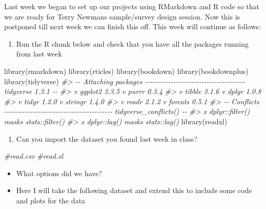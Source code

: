 \documentclass[
]{book}
\newenvironment{Shaded}{\begin{snugshade}}{\end{snugshade}}
\newcommand{\CommentTok}[1]{\textcolor[rgb]{0.56,0.35,0.01}{\textit{#1}}}
\newcommand{\FunctionTok}[1]{\textcolor[rgb]{0.00,0.00,0.00}{#1}}
\newcommand{\NormalTok}[1]{#1}
\providecommand{\tightlist}{%
  \setlength{\itemsep}{0pt}\setlength{\parskip}{0pt}}
\begin{document}
Last week we began to set up our projects using RMarkdown and R code so that we are ready for Terry Newmans sample/survey design session. Now this is postponed till next week we can finish this off. This week will continue as follows:

\begin{enumerate}
\def\labelenumi{\arabic{enumi}.}
\tightlist
\item
  Run the R chunk below and check that you have all the packages running from last week
\end{enumerate}

\begin{Shaded}
\begin{Highlighting}[]
\FunctionTok{library}\NormalTok{(rmarkdown)}
\FunctionTok{library}\NormalTok{(rticles)}
\FunctionTok{library}\NormalTok{(bookdown)}
\FunctionTok{library}\NormalTok{(bookdownplus)}
\FunctionTok{library}\NormalTok{(tidyverse)}
\CommentTok{\#\textgreater{} {-}{-} Attaching packages {-}{-}{-}{-}{-}{-}{-}{-}{-}{-}{-}{-}{-}{-}{-}{-}{-}{-}{-}{-}{-}{-}{-}{-}{-}{-}{-}{-}{-}{-}{-}{-}{-}{-}{-}{-}{-}{-}{-} tidyverse 1.3.1 {-}{-}}
\CommentTok{\#\textgreater{} v ggplot2 3.3.5     v purrr   0.3.4}
\CommentTok{\#\textgreater{} v tibble  3.1.6     v dplyr   1.0.8}
\CommentTok{\#\textgreater{} v tidyr   1.2.0     v stringr 1.4.0}
\CommentTok{\#\textgreater{} v readr   2.1.2     v forcats 0.5.1}
\CommentTok{\#\textgreater{} {-}{-} Conflicts {-}{-}{-}{-}{-}{-}{-}{-}{-}{-}{-}{-}{-}{-}{-}{-}{-}{-}{-}{-}{-}{-}{-}{-}{-}{-}{-}{-}{-}{-}{-}{-}{-}{-}{-}{-}{-}{-}{-}{-}{-}{-} tidyverse\_conflicts() {-}{-}}
\CommentTok{\#\textgreater{} x dplyr::filter() masks stats::filter()}
\CommentTok{\#\textgreater{} x dplyr::lag()    masks stats::lag()}
\FunctionTok{library}\NormalTok{(readxl)}
\end{Highlighting}
\end{Shaded}

\begin{enumerate}
\def\labelenumi{\arabic{enumi}.}
\setcounter{enumi}{1}
\tightlist
\item
  Can you import the dataset you found last week in class?
\end{enumerate}

\begin{Shaded}
\begin{Highlighting}[]
\CommentTok{\#read.csv}
\CommentTok{\#read.xl}
\end{Highlighting}
\end{Shaded}

\begin{itemize}
\tightlist
\item
  What options did we have?
\item
  Here I will take the following dataset and extend this to include some code and plots for the data
\end{itemize}
\end{document}
